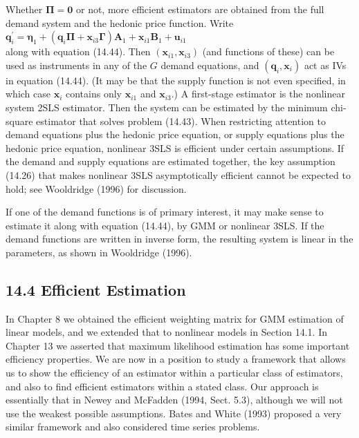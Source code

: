 \documentclass[10pt]{article}
\begin{document}
Whether $\boldsymbol{\Pi}=\mathbf{0}$ or not, more efficient estimators are obtained from the full demand system and the hedonic price function. Write\\
$\mathbf{q}_{i}^{\prime}=\boldsymbol{\eta}_{1}+\left(\mathbf{q}_{i} \boldsymbol{\Pi}+\mathbf{x}_{i 3} \boldsymbol{\Gamma}\right) \mathbf{A}_{1}+\mathbf{x}_{i 1} \mathbf{B}_{1}+\mathbf{u}_{i 1}$\\
along with equation (14.44). Then $\left(\mathbf{x}_{i 1}, \mathbf{x}_{i 3}\right)$ (and functions of these) can be used as instruments in any of the $G$ demand equations, and $\left(\mathbf{q}_{i}, \mathbf{x}_{i}\right)$ act as IVs in equation (14.44). (It may be that the supply function is not even specified, in which case $\mathbf{x}_{i}$ contains only $\mathbf{x}_{i 1}$ and $\mathbf{x}_{i 3}$.) A first-stage estimator is the nonlinear system 2SLS estimator. Then the system can be estimated by the minimum chi-square estimator that solves problem (14.43). When restricting attention to demand equations plus the hedonic price equation, or supply equations plus the hedonic price equation, nonlinear 3SLS is efficient under certain assumptions. If the demand and supply equations are estimated together, the key assumption (14.26) that makes nonlinear 3SLS asymptotically efficient cannot be expected to hold; see Wooldridge (1996) for discussion.

If one of the demand functions is of primary interest, it may make sense to estimate it along with equation (14.44), by GMM or nonlinear 3SLS. If the demand functions are written in inverse form, the resulting system is linear in the parameters, as shown in Wooldridge (1996).

\subsection*{14.4 Efficient Estimation}
In Chapter 8 we obtained the efficient weighting matrix for GMM estimation of linear models, and we extended that to nonlinear models in Section 14.1. In Chapter 13 we asserted that maximum likelihood estimation has some important efficiency properties. We are now in a position to study a framework that allows us to show the efficiency of an estimator within a particular class of estimators, and also to find efficient estimators within a stated class. Our approach is essentially that in Newey and McFadden (1994, Sect. 5.3), although we will not use the weakest possible assumptions. Bates and White (1993) proposed a very similar framework and also considered time series problems.
\end{document}
